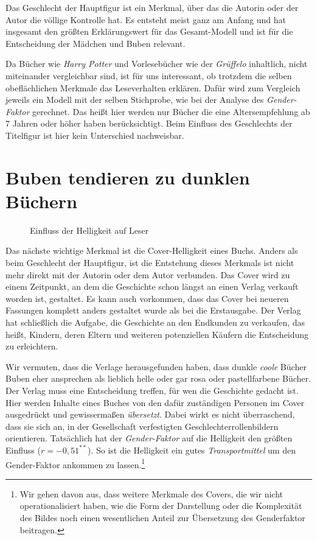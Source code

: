 Das Geschlecht der Hauptfigur ist ein Merkmal, über das die Autorin oder
der Autor die völlige Kontrolle hat. Es entsteht meist ganz am Anfang
und hat insgesamt den größten Erklärungswert für das Gesamt-Modell und
ist für die Entscheidung der Mädchen und Buben relevant.

Da Bücher wie \emph{Harry Potter} und Vorlesebücher wie der
\emph{Grüffelo} inhaltlich, nicht miteinander vergleichbar sind, ist für
uns interessant, ob trotzdem die selben obeflächlichen Merkmale das
Leseverhalten erklären. Dafür wird zum Vergleich jeweils ein Modell mit
der selben Stichprobe, wie bei der Analyse des \emph{Gender-Faktor}
gerechnet. Das heißt hier werden nur Bücher die eine Altersempfehlung ab
7 Jahren oder höher haben berücksichtigt. Beim Einfluss des Geschlechts
der Titelfigur ist hier kein Unterschied nachweisbar.

\section{Buben tendieren zu dunklen Büchern}

\begin{figure}
\center
  \label{helligkeit}
  \small

  \caption[Einfluss der Helligkeit auf Leser]{Einfluss der Helligkeit auf Leser}
\end{figure}

Das nächste wichtige Merkmal ist die Cover-Helligkeit eines Buchs.
Anders als beim Geschlecht der Hauptfigur, ist die Entstehung dieses
Merkmals ist nicht mehr direkt mit der Autorin oder dem Autor verbunden.
Das Cover wird zu einem Zeitpunkt, an dem die Geschichte schon längst an
einen Verlag verkauft worden ist, gestaltet. Es kann auch vorkommen,
dass das Cover bei neueren Fassungen komplett anders gestaltet wurde als
bei die Erstausgabe. Der Verlag hat schließlich die Aufgabe, die
Geschichte an den Endkunden zu verkaufen, das heißt, Kindern, deren
Eltern und weiteren potenziellen Käufern die Entscheidung zu
erleichtern.

Wir vermuten, dass die Verlage herausgefunden haben, dass dunkle
\emph{coole} Bücher Buben eher ansprechen als lieblich helle oder gar
rosa oder pastellfarbene Bücher. Der Verlag muss eine Entscheidung
treffen, für wen die Geschichte gedacht ist. Hier werden Inhalte eines
Buches von den dafür zuständigen Personen im Cover ausgedrückt und
gewissermaßen \emph{übersetzt}. Dabei wirkt es nicht überraschend, dass
sie sich an, in der Gesellschaft verfestigten Geschlechterrollenbildern
orientieren. Tatsächlich hat der \emph{Gender-Faktor} auf die Helligkeit
den größten Einfluss ($r=-0{,}51^{**}$). So ist die Helligkeit ein gutes
\emph{Transportmittel} um den Gender-Faktor ankommen zu
lassen.\footnote{Wir gehen davon aus, dass weitere Merkmale des Covers, die wir nicht operationalisiert haben, wie die Form der Darstellung oder die Komplexität des Bildes noch einen wesentlichen Anteil zur Übersetzung des Genderfaktor beitragen.}


